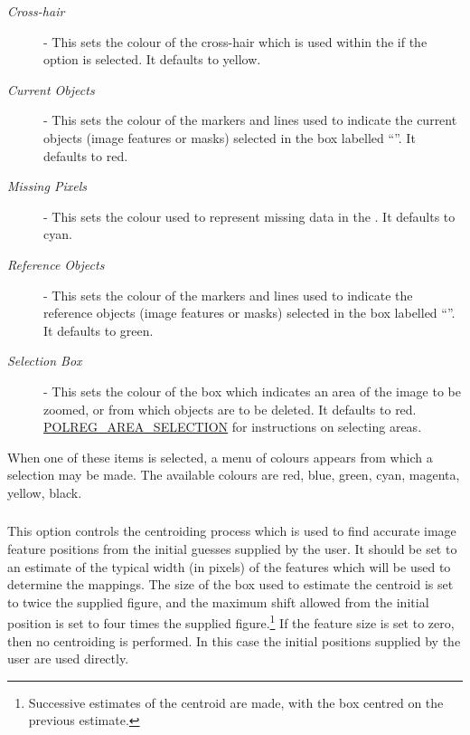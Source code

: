 \begin{description}

\item [{\em Cross-hair}] - This sets the colour of the cross-hair which
is used within the  if
the  option is
selected. It defaults to yellow.

\item [{\em Current Objects}] - This sets the colour of the markers and
lines used to indicate the current objects (image features or masks)
selected in the box labelled ``''.
It defaults to red.

\item [{\em Missing Pixels}] -  This sets the colour used to represent
missing data in the .
It defaults to cyan.

\item [{\em Reference Objects}] - This sets the colour of the markers and
lines used to indicate the reference objects (image features or masks)
selected in the box labelled ``''.
It defaults to green.

\item [{\em Selection Box}] - This sets the colour of the box
which indicates an area of the image to be zoomed, or from which objects
are to be deleted. It defaults to red. \hyperref{Go here}{See
section }{}{POLREG_AREA_SELECTION} for instructions on selecting areas.

\end{description}

When one of these items is selected, a menu of colours appears from which
a selection may be made. The available colours are red, blue, green,
cyan, magenta, yellow, black.

\subsubsection {} This option
controls the centroiding process which is used to find accurate image
feature positions from the initial guesses supplied by the user. It
should be set to an estimate of the typical width (in pixels) of the
features which will be used to determine the mappings. The size of the
box used to estimate the centroid is set to twice the supplied figure,
and the maximum shift allowed from the initial position is set to four
times the supplied figure.\footnote{Successive estimates of the centroid
are made, with the box centred on the previous estimate.} If the feature
size is set to zero, then no centroiding is performed. In this case the
initial positions supplied by the user are used directly.

